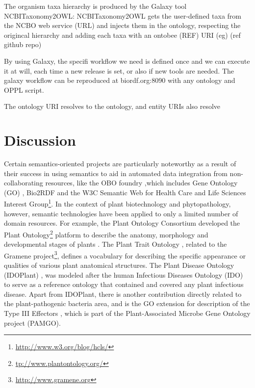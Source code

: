 \documentclass[sw]{iosart2c}
\newcommand{\myurl}[1]{\footnote{\url{#1}}}
\begin{document}
The organism taxa hierarchy is produced by the Galaxy tool NCBITaxonomy2OWL: NCBITaxonomy2OWL gets the user-defined taxa from the NCBO web service (URL) and injects them in the ontology, respecting the origincal hierarchy and adding each taxa with an ontobee (REF) URI (eg) (ref github repo)

By using Galaxy, the specifi workflow we need is defined once and we can execute it at will, each time a new release is set, or also if new tools are needed. The galaxy workflow can be reproduced at biordf.org:8090 with any ontology and OPPL script.

The ontology URI resolves to the ontology, and entity URIs also resolve 



\section{Discussion}

Certain semantics-oriented projects are particularly noteworthy as a result of their success in using semantics to aid in automated data  integration from non-collaborating resources, like the OBO foundry \cite{Smith},which includes Gene Ontology (GO) \cite{Gene}, Bio2RDF \cite{RDF} and the W3C Semantic  Web  for Health  Care  and  Life Sciences Interest Group\myurl{http://www.w3.org/blog/hcls/}. In the context of plant biotechnology and phytopathology, however, semantic technologies have been applied to only a limited number of domain resources. For example, the Plant Ontology Consortium developed the Plant Ontology\myurl{tp://www.plantontology.org/} platform to describe the anatomy, morphology and developmental stages of plants \cite{PO}. The Plant Trait Ontology \cite{PTO}, related to the Gramene project\myurl{http://www.gramene.org}, defines a vocabulary for describing the specific appearance or qualities of various plant anatomical structures. The Plant Disease Ontology (IDOPlant) \cite{Walls}, was modeled after the human Infectious Diseases Ontology (IDO) \cite{IDO} to serve as a reference ontology that contained and covered any plant infectious disease. Apart from IDOPlant, there is another contribution directly related to the plant-pathogenic bacteria area, and is the GO extension for description of the Type III Effectors \cite{Lindeberg}, which is part of the Plant-Associated Microbe Gene Ontology project (PAMGO). 
\end{document}
